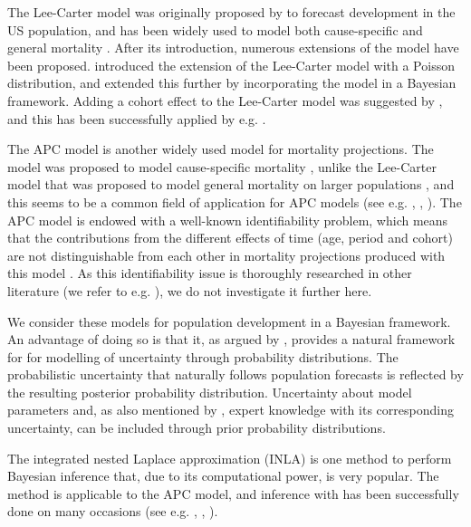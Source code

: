 \newpar The Lee-Carter model was originally proposed by \textcite{LeeCarter1992} to forecast development in the US population, and has been widely used to model both cause-specific and general mortality \parencite{GirosiKing2007}. After its introduction, numerous extensions of the model have been proposed. \textcite{BROUHNS2002373} introduced the extension of the Lee-Carter model with a Poisson distribution, and \textcite{CZADO2005260} extended this further by incorporating the model in a Bayesian framework. Adding a cohort effect to the Lee-Carter model was suggested by \textcite{RENSHAW2006556}, and this has been successfully applied by e.g. \textcite{Wisniowski2015}.

\newpar The APC model \parencite{Clayton1987} is another widely used model for mortality projections. The model was proposed to model cause-specific mortality \parencite{Clayton1987}, unlike the Lee-Carter model that was proposed to model general mortality on larger populations \parencite{LeeCarter1992}, and this seems to be a common field of application for APC models (see e.g. \textcite{rieblerHeld2010}, \textcite{RieblerHeldRue2012}, \textcite{rieblerSwissSuicide2012}). The APC model is endowed with a well-known identifiability problem, which means that the contributions from the different effects of time (age, period and cohort) are not distinguishable from each other in mortality projections produced with this model \parencite{RieblerThesis2010, RieblerHeldRue2012}. As this identifiability issue is thoroughly researched in other literature (we refer to e.g. \textcite{RieblerThesis2010}), we do not investigate it further here. 

\newpar We consider these models for population development in a Bayesian framework. An advantage of doing so is that it, as argued by \textcite{Wisniowski2015}, provides a natural framework for for modelling of uncertainty through probability distributions. The probabilistic uncertainty that naturally follows population forecasts is reflected by the resulting posterior probability distribution. Uncertainty about model parameters and, as also mentioned by \textcite{Wisniowski2015}, expert knowledge with its corresponding uncertainty, can be included through prior probability distributions.

The integrated nested Laplace approximation (INLA) \parencite{rue2009inla} is one method to perform Bayesian inference that, due to its computational power, is very popular. The \inla method is applicable to the APC model, and inference with \inla has been successfully done on many occasions (see e.g. \textcite{RieblerThesis2010}, \textcite{RieblerHeldRue2012}, \textcite{rieblerSwissSuicide2012}). 

